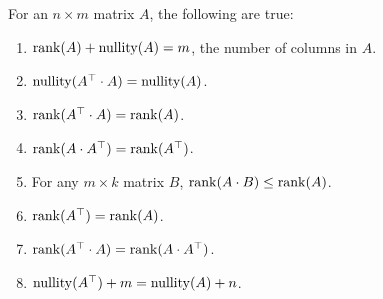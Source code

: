 \begin{tcolorbox}[sharp corners, colback=green!30, colframe=green!80!blue, title=\textbf{\Large Useful Properties of Rank and Nullity}]
   For an $n \times m$ matrix $A$, the following are true:
\begin{enumerate}
\renewcommand{\labelenumi}{(\alph{enumi})}
\setlength{\itemsep}{.2cm}
\item  $\mathrm{rank}(A) + \mathrm{nullity}(A) =m$, the number of columns in $A$.

           
\item  $\mathrm{nullity}(A^\top \cdot A)=\mathrm{nullity}(A)$.
     
\item  $\mathrm{rank}(A^\top \cdot A)=\mathrm{rank}(A)$.

\item  $\mathrm{rank}(A \cdot  A^\top)=\mathrm{rank}(A^\top)$.

\item  For any $m \times k$ matrix $B$, $\mathrm{rank}(A \cdot B) \le  \mathrm{rank}(A)$.

\item $\mathrm{rank}(A^\top)=\mathrm{rank}(A)$.

\item  $\mathrm{rank}(A^\top \cdot A)=\mathrm{rank}(A \cdot A^\top)$.

\item  $\mathrm{nullity}(A^\top)+ m=\mathrm{nullity}(A) + n$.
    \end{enumerate}
    
    \end{tcolorbox}





